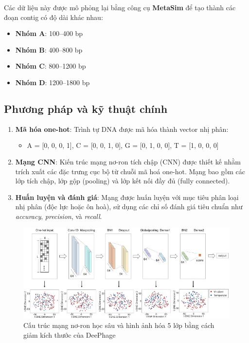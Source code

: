 Các dữ liệu này được mô phỏng lại bằng công cụ \textbf{MetaSim} để tạo thành các đoạn contig có độ dài khác nhau:
\begin{itemize}
    \item \textbf{Nhóm A}: 100–400 bp
    \item \textbf{Nhóm B}: 400–800 bp
    \item \textbf{Nhóm C}: 800–1200 bp
    \item \textbf{Nhóm D}: 1200–1800 bp
\end{itemize}


\subsection*{Phương pháp và kỹ thuật chính}

\begin{enumerate}
    \item \textbf{Mã hóa one-hot}: Trình tự DNA được mã hóa thành vector nhị phân:
    \begin{itemize}
        \item A = [0, 0, 0, 1], C = [0, 0, 1, 0], G = [0, 1, 0, 0], T = [1, 0, 0, 0]
    \end{itemize}
    
    \item \textbf{Mạng CNN}: Kiến trúc mạng nơ-ron tích chập (CNN) được thiết kế nhằm trích xuất các đặc trưng cục bộ từ chuỗi mã hoá one-hot. Mạng bao gồm các lớp tích chập, lớp gộp (pooling) và lớp kết nối đầy đủ (fully connected).

    \item \textbf{Huấn luyện và đánh giá}: Mạng được huấn luyện với mục tiêu phân loại nhị phân (độc lực hoặc ôn hoà), sử dụng các chỉ số đánh giá tiêu chuẩn như \textit{accuracy}, \textit{precision}, và \textit{recall}.
\end{enumerate}
\begin{figure}[H]
    \centering
    \includegraphics[width=1\linewidth]{figures/DeePhage_Model.jpg}
    \caption{Cấu trúc mạng nơ-ron học sâu và hình ảnh hóa 5 lớp bằng cách giảm kích thước của DeePhage}
    \label{fig:DeePhage_model}
\end{figure}

